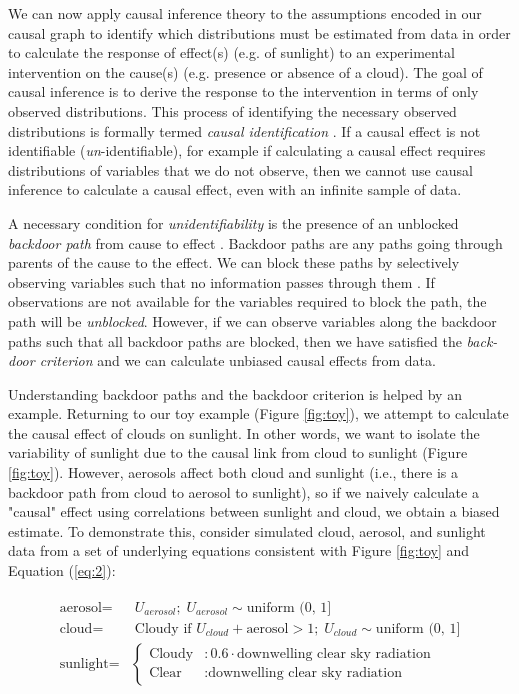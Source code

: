 \documentclass[12pt]{article}
\begin{document}
We can now apply causal inference theory
\citep[e.g.,][]{pearl1995causal,tian2002general,shpitser2006} to the
assumptions encoded in our causal graph to identify which
distributions must be estimated from data in order to calculate the
response of effect(s) (e.g. of sunlight) to an experimental
intervention on the cause(s) (e.g. presence or absence of a
cloud). The goal of causal inference is to derive the response to the
intervention in terms of only observed distributions. This process of
identifying the necessary observed distributions is formally termed
\emph{causal identification} \citep[][, Ch. 3]{pearl2009causality}. If
a causal effect is not identifiable (\emph{un}-identifiable), for
example if calculating a causal effect requires distributions of
variables that we do not observe, then we cannot use causal inference
to calculate a causal effect, even with an infinite sample of
data.

A necessary condition for \emph{unidentifiability} is the presence of
an unblocked \emph{backdoor path} from cause to effect \citep[][,
Ch. 3]{pearl2009causality}. Backdoor paths are any paths going through
parents of the cause to the effect. We can block these paths by
selectively observing variables such that no information passes
through them \citep{geiger-d-sep}. If observations are not available
for the variables required to block the path, the path will be
\emph{unblocked}. However, if we can observe variables along the
backdoor paths such that all backdoor paths are blocked, then we have
satisfied the \emph{back-door criterion} \citep{pearl2009} and we can
calculate unbiased causal effects from data.

Understanding backdoor paths and the backdoor criterion is helped by
an example. Returning to our toy example (Figure \ref{fig:toy}), we
attempt to calculate the causal effect of clouds on sunlight. In other
words, we want to isolate the variability of sunlight due to the
causal link from cloud to sunlight (Figure \ref{fig:toy}). However,
aerosols affect both cloud and sunlight (i.e., there is a backdoor
path from cloud to aerosol to sunlight), so if we naively calculate a
"causal" effect using correlations between sunlight and cloud, we obtain
a biased estimate. To demonstrate this, consider simulated cloud,
aerosol, and sunlight data from a set of underlying equations
consistent with Figure \ref{fig:toy} and Equation (\ref{eq:2}):


\begin{align}
  \begin{split}
    \text{aerosol} =& \; U_{aerosol}; \; U_{aerosol} \sim
    \text{uniform (0, 1]}\\ \text{cloud} =& \; \text{Cloudy if } U_{cloud} +
    \text{aerosol} > 1; \; U_{cloud} \sim \text{uniform (0, 1]}\\ \text{sunlight}
    =& \begin{cases} \text{Cloudy} &: 0.6 \cdot \text{downwelling clear
        sky radiation} \\ \text{Clear} &: \text{downwelling clear sky
        radiation}
    \end{cases}
    \label{eq:1}
  \end{split}
\end{align}
\end{document}
